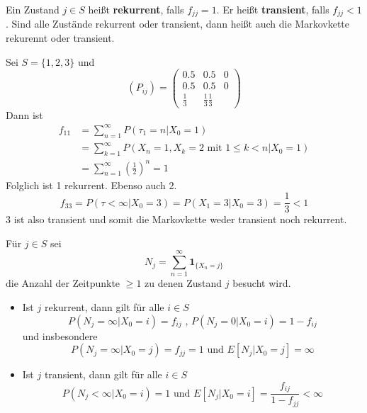 \documentclass[a4paper,12pt]{article}
\begin{document}
Ein Zustand $j \in S$ heißt \textbf{rekurrent}, falls $f_{jj} = 1$.
Er heißt \textbf{transient}, falls $f_{jj}<1$.
Sind alle Zustände rekurrent oder transient, dann heißt auch die Markovkette rekurennt oder transient.


\begin{tcolorbox}[breakable, colframe=blue, colback=white, title=Beispiel 15]
	Sei $S = \{1,2,3\}$ und
	$$
		(P_{ij}) = \begin{pmatrix}
			0.5         & 0.5                     & 0 \\
			0.5         & 0.5                     & 0 \\
			\frac{1}{3} & \frac{1}{3} \frac{1}{3}
		\end{pmatrix}
	$$
	Dann ist
	\begin{align*}
		f_{11} & = \sum_{n=1}^{\infty}P(\tau_1 = n | X_0 = 1)                                 \\
		       & = \sum_{k=1}^{\infty}P(X_n = 1, X_k = 2 \text{ mit } 1 \leq k < n |X_0 = 1 ) \\
		       & = \sum_{n=1}^{\infty}\left(\frac{1}{2}\right)^n = 1
	\end{align*}
	Folglich ist 1 rekurrent. Ebenso auch 2.
	$$
		f_{33} = P(\tau < \infty |X_0 = 3) = P(X_1 = 3| X_0 = 3) =\frac{1}{3} < 1
	$$
	3 ist also transient und somit die Markovkette weder transient noch rekurrent.

\end{tcolorbox}


\begin{tcolorbox}[breakable, colframe=green, colback=white, title=Satz 18]
	Für $j \in S$ sei
	$$
		N_j = \sum_{n=1}^{\infty}\textbf{1}_{\{X_n = j\}}
	$$
	die Anzahl der Zeitpunkte $\geq 1$ zu denen Zustand $j$ besucht wird.\\
	\begin{itemize}
		\item Ist $j$ rekurrent, dann gilt für alle $i \in S$
		      $$
			      P(N_j = \infty | X_0 = i) = f_{ij} \text{ , } P(N_j = 0 |X_0 = i) = 1 - f_{ij}
		      $$
		      und insbesondere
		      $$
			      P(N_j = \infty | X_0 = j) = f_{jj} = 1 \text{ und } E[N_j|X_0 = j] = \infty
		      $$
		\item Ist $j$ transient, dann gilt für alle $i \in S$
		      $$
			      P(N_j <  \infty| X_0 = i) = 1 \text{ und } E[N_j|X_0 = i] = \frac{f_{ij}}{1 - f_{jj}} < \infty
		      $$
	\end{itemize}
\end{tcolorbox}
\end{document}
